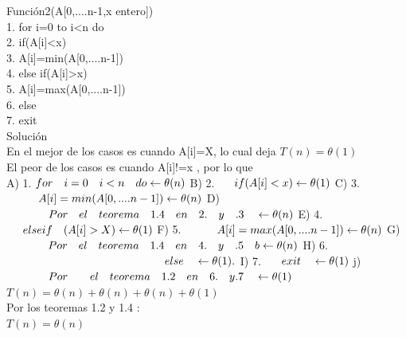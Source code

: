 \documentclass[spanish]{article}
\begin{document}
	Función2(A[0,....n-1,x entero])\\
	1. for i=0 to i<n do\\
	2. \hspace{0.5cm} if(A[i]<x)\\
	3.  \hspace{1.0cm} A[i]=min(A[0,....n-1])\\
	4. \hspace{0.5cm} else if(A[i]>x) \\
	5. \hspace{1.0cm} A[i]=max(A[0,....n-1])\\
	6. \hspace{0.5cm} else\\
	7.\hspace{1.0cm} exit\\
	Solución\\
	En el mejor de los casos es cuando  A[i]=X, lo cual deja   $T(n) = \theta(1)$ \\
	El peor de los casos es cuando A[i]!=x , por lo que \\
	A) 1. $ for \quad i =0 \quad i< n \quad do \leftarrow \theta (n)\\ $
	B) 2. $ \hspace{0.5cm} if(A[i]<x) \leftarrow \theta(1)\\$
	C) 3. $ \hspace{1.0cm} A[i]=min(A[0,....n-1]) \leftarrow \theta(n)\\$
	D)$ \hspace{1.3cm} Por\quad el \quad teorema \quad 1.4 \quad en \quad 2.\quad  y\quad  .3 \quad \leftarrow \theta(n)\\$
	E) 4. $\hspace{0.5cm} elseif \quad (A[i]>X) \leftarrow \theta(1)\\ $
	F) 5. $\hspace{1.0cm} A[i]=max(A[0,....n-1]) \leftarrow \theta(n)\\$
	G)$ \hspace{1.3cm} Por \quad  el \quad  teorema \quad   1.4 \quad en \quad   4. \quad   y \quad  .5 \quad b\leftarrow \theta(n)\\$
	H) 6. $\hspace{50mm} else \quad  \leftarrow \theta(1).\\$
	I) 7. $\hspace{0.5cm}  exit \quad \leftarrow \theta(1)\\$
	j)$ \hspace{1.3cm} Por \quad \quad el \quad teorema \quad  1.2 \quad en \quad 6. \quad  y .7 \quad \leftarrow \theta(1)\\$
	$T(n) = \theta(n) + \theta(n)  + \theta(n) + \theta(1) $\\
		Por los teoremas 1.2 y 1.4 :\\
		$T(n) = \theta(n)$ \\
		\bigskip
\end{document}
